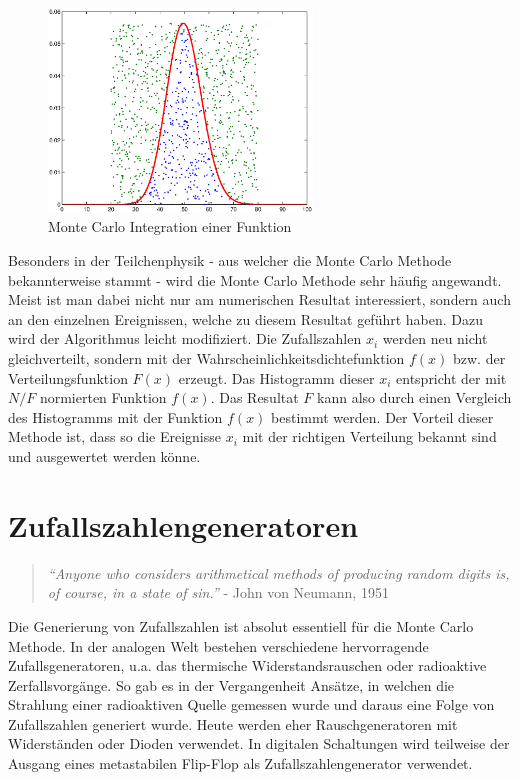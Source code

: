 \documentclass{book}
\begin{document}
\begin{refsection}
\begin{figure}[htbp]
	\centering
	\includegraphics[width=7cm]{images/integration_poisson.eps}
	\caption{Monte Carlo Integration einer Funktion}
	\label{fig:integration_histogram}
\end{figure}

Besonders in der Teilchenphysik - aus welcher die Monte Carlo Methode bekannterweise stammt - wird die Monte Carlo Methode sehr häufig angewandt. Meist ist man dabei nicht nur am numerischen Resultat interessiert, sondern auch an den einzelnen Ereignissen, welche zu diesem Resultat geführt haben. Dazu wird der Algorithmus leicht modifiziert. Die Zufallszahlen $x_i$ werden neu nicht gleichverteilt, sondern mit der Wahrscheinlichkeitsdichtefunktion $f(x)$ bzw. der Verteilungsfunktion $F(x)$ erzeugt. Das Histogramm dieser $x_i$ entspricht der mit $N/F$ normierten Funktion $f(x)$. Das Resultat $F$ kann also durch einen Vergleich des Histogramms mit der Funktion $f(x)$ bestimmt werden. Der Vorteil dieser Methode ist, dass so die Ereignisse $x_i$ mit der richtigen Verteilung bekannt sind und ausgewertet werden könne.


\section{Zufallszahlengeneratoren} 

\begin{quote}
\textit{“Anyone who considers arithmetical methods of producing random digits is, of course, in a state of sin.”} - John von Neumann, 1951
\end{quote}

Die Generierung von Zufallszahlen ist absolut essentiell für die Monte Carlo Methode. In der analogen Welt bestehen verschiedene hervorragende Zufallsgeneratoren, u.a. das thermische Widerstandsrauschen oder radioaktive Zerfallsvorgänge. So gab es in der Vergangenheit Ansätze, in welchen die Strahlung einer radioaktiven Quelle gemessen wurde und daraus eine Folge von Zufallszahlen generiert wurde. Heute werden eher Rauschgeneratoren mit Widerständen oder Dioden verwendet. In digitalen Schaltungen wird teilweise der Ausgang eines metastabilen Flip-Flop als Zufallszahlengenerator verwendet.\\


\end{refsection}
\end{document}
